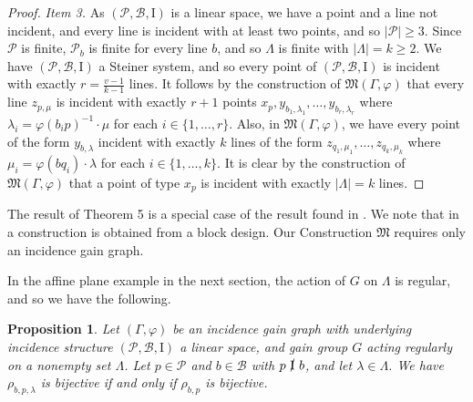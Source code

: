 \documentclass[11pt]{article}
\newtheorem{proposition}[theorem]{Proposition}
\theoremstyle{definition}
\begin{document}
\begin{proof}
\textit{Item 3.}  As $(\mathscr{P},\mathscr{B},\mathrm{I})$ is a linear space, we have a point and a line not incident, and every line is incident with at least two points, and so $|\mathscr{P}| \geq 3$.  Since $\mathscr{P}$ is finite, $\mathscr{P}_b$ is finite for every line $b$, and so $\Lambda$ is finite with $|\Lambda| =k \geq 2$.  We have $(\mathscr{P},\mathscr{B},\mathrm{I})$ a Steiner system, and so every point of $(\mathscr{P},\mathscr{B},\mathrm{I})$ is incident with exactly $\displaystyle r =  \frac{v-1}{k-1}$ lines.   It follows by the construction of $\mathfrak{M}(\Gamma,\varphi)$ that every line $z_{p,\mu}$ is incident with exactly $r+1$ points $x_p,y_{b_1,\lambda_1}, \dots, y_{b_r,\lambda_r}$ where $\lambda_i = \varphi(b_i p )^{-1} \cdot \mu$ for each $i \in \{1,\dots,r\}$.  Also, in $\mathfrak{M}(\Gamma,\varphi)$, we have every point of the form $y_{b,\lambda}$ incident with exactly $k$ lines of the form $z_{q_1,\mu_1}, \dots, z_{q_k,\mu_k}$ where $\mu_i = \varphi(bq_i) \cdot \lambda$ for each $i \in \{1,\dots,k\}$.  It is clear by the construction of $\mathfrak{M}(\Gamma,\varphi)$ that a point of type $x_p$ is incident with exactly $|\Lambda| = k$ lines.  
\end{proof}

The result of Theorem 5 is a special case of the result found in \cite{Mcc24}.  We note that in \cite{Mcc24} a construction is obtained from a block design.  Our Construction $\mathfrak{M}$ requires only an incidence gain graph.

In the affine plane example in the next section, the action of $G$ on $\Lambda$ is regular, and so we have the following. 

\begin{proposition}
Let $(\Gamma,\varphi)$ be an incidence gain graph with underlying incidence structure $(\mathscr{P},\mathscr{B},\mathrm{I})$ a linear space, and gain group $G$ acting regularly on a nonempty set $\Lambda$.  Let $p \in \mathscr{P}$ and $b \in \mathscr{B}$ with $p \  \cancel{\mathrm{I}} \  b$, and let $\lambda \in \Lambda$.  We have $\rho_{b,p,\lambda}$ is bijective if and only if $\rho_{b,p}$ is bijective.
\end{proposition}
\end{document}
